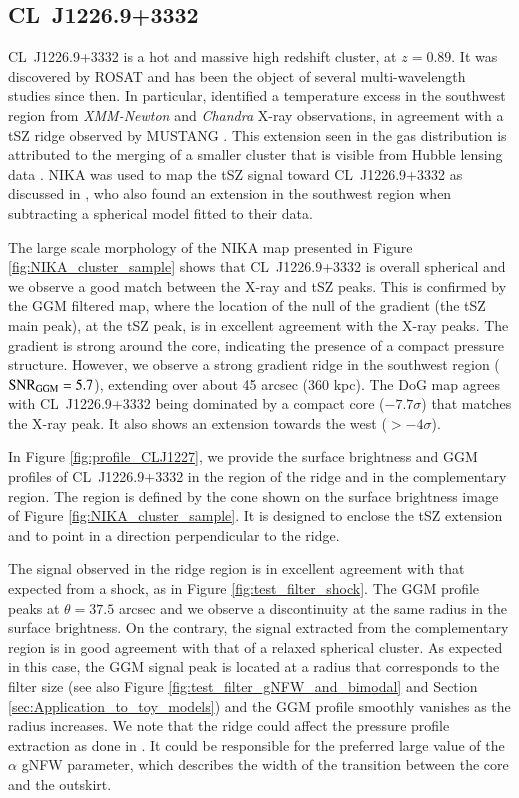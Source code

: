 \documentclass[twocolumn,traditabstract]{aa}
\begin{document}
\subsection{CL~J1226.9+3332}
\mbox{CL~J1226.9+3332} is a hot and massive high redshift cluster, at $z=0.89$. It was discovered by ROSAT \citep{Ebeling2001} and has been the object of several multi-wavelength studies since then. In particular, \cite{Maughan2007} identified a temperature excess in the southwest region from \textit{XMM-Newton} and \textit{Chandra} X-ray observations, in agreement with a tSZ ridge observed by MUSTANG \citep{Korngut2011}. This extension seen in the gas distribution is attributed to the merging of a smaller cluster that is visible from Hubble lensing data \citep{Jee2009}. NIKA was used to map the tSZ signal toward \mbox{CL~J1226.9+3332} as discussed in \cite{Adam2015}, who also found an extension in the southwest region when subtracting a spherical model fitted to their data.

The large scale morphology of the NIKA map presented in Figure \ref{fig:NIKA_cluster_sample} shows that \mbox{CL~J1226.9+3332} is overall spherical and we observe a good match between the X-ray and tSZ peaks. This is confirmed by the GGM filtered map, where the location of the null of the gradient (the tSZ main peak), at the tSZ peak, is in excellent agreement with the X-ray peaks. The gradient is strong around the core, indicating the presence of a compact pressure structure. However, we observe a strong gradient ridge in the southwest region (${\rm SNR}_{\rm GGM} = 5.7$), extending over about 45 arcsec (360 kpc). The DoG map agrees with \mbox{CL~J1226.9+3332} being dominated by a compact core ($-7.7 \sigma$) that matches the X-ray peak. It also shows an extension towards the west ($> -4 \sigma$).

In Figure \ref{fig:profile_CLJ1227}, we provide the surface brightness and GGM profiles of \mbox{CL~J1226.9+3332} in the region of the ridge and in the complementary region. The region is defined by the cone shown on the surface brightness image of Figure \ref{fig:NIKA_cluster_sample}. It is designed to enclose the tSZ extension and to point in a direction perpendicular to the ridge. 

The signal observed in the ridge region is in excellent agreement with that expected from a shock, as in Figure \ref{fig:test_filter_shock}. The GGM profile peaks at $\theta = 37.5$ arcsec and we observe a discontinuity at the same radius in the surface brightness. On the contrary, the signal extracted from the complementary region is in good agreement with that of a relaxed spherical cluster. As expected in this case, the GGM signal peak is located at a radius that corresponds to the filter size (see also Figure \ref{fig:test_filter_gNFW_and_bimodal} and Section \ref{sec:Application_to_toy_models}) and the GGM profile smoothly vanishes as the radius increases. We note that the ridge could affect the pressure profile extraction as done in \cite{Romero2017}. It could be responsible for the preferred large value of the $\alpha$ gNFW parameter, which describes the width of the transition between the core and the outskirt.
\end{document}
